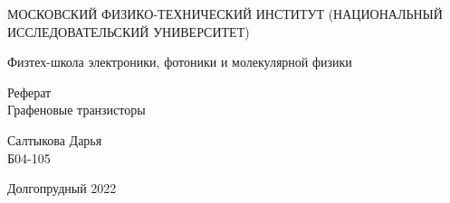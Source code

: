 \documentclass[a4paper,12pt]{article} %
\begin{document}
	
	\begin{titlepage}
	\begin{center}
		{\large МОСКОВСКИЙ ФИЗИКО-ТЕХНИЧЕСКИЙ ИНСТИТУТ (НАЦИОНАЛЬНЫЙ ИССЛЕДОВАТЕЛЬСКИЙ УНИВЕРСИТЕТ)}
	\end{center}
	\begin{center}
		{\large Физтех-школа электроники, фотоники и молекулярной физики}
	\end{center}
	
	
	\vspace{4.5cm}
	{\huge
		\begin{center}
			{Реферат}\\
			Графеновые транзисторы
		\end{center}
	}
	\vspace{2cm}
	\begin{flushright}
		{\LARGE Салтыкова Дарья \\
			\vspace{0.5cm}
			Б04-105}
	\end{flushright}
	\vspace{8cm}
	\begin{center}
		Долгопрудный 2022
	\end{center}
\end{titlepage}


\newpage
\end{document}
